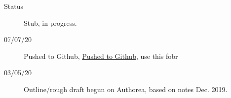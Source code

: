 \begin{description}
\item [{Status}] Stub, in progress.
\item [{07/07/20}] Pushed to Github, \href{https://github.com/phockett/Extracting-Molecular-Frame-Photoionization-Dynamics-from-Experimental-Data}{Pushed to Github}, use this fobr 
\item [{03/05/20}] Outline/rough draft begun on Authorea, based on notes Dec. 2019.
\end{description}